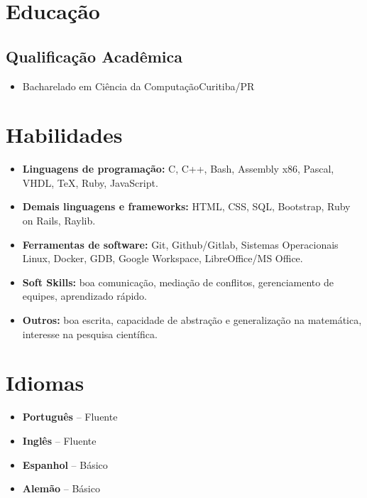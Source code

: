 \documentclass[a4paper, 12pt]{moderncv}
\begin{document}
\section{Educação}
\vspace{1pt}
\subsection{\small{Qualificação Acadêmica}}
\vspace{2pt}
\begin{itemize}
    \item{
        {Bacharelado em Ciência da Computação}{Curitiba/PR}{}{}}
\end{itemize}
\vspace{4pt}

\section{Habilidades}
\vspace{4pt}
\begin{itemize}
    \item{\textbf{Linguagens de programação:} C, C++, Bash, Assembly x86,
        Pascal, VHDL, \TeX, Ruby, JavaScript.}
    \vspace{4pt}
    \item{\textbf{Demais linguagens e frameworks:} HTML, CSS, SQL, Bootstrap, Ruby on Rails, Raylib.}
    \vspace{4pt}
    \item{\textbf{Ferramentas de software:} Git, Github/Gitlab, Sistemas
        Operacionais Linux, Docker, GDB, Google Workspace, LibreOffice/MS
        Office.}
    \vspace{4pt}
    \item{\textbf{Soft Skills:} boa comunicação, mediação de conflitos, gerenciamento
        de equipes, aprendizado rápido.}
    \vspace{4pt}
    \item{\textbf{Outros:} boa escrita, capacidade de abstração e generalização na
        matemática, interesse na pesquisa científica.}
\end{itemize}
\vspace{4pt}

\section{Idiomas}
\vspace{4pt}
\begin{itemize}
    \item{\textbf{Português} -- Fluente}
    \item{\textbf{Inglês} -- Fluente}
    \item{\textbf{Espanhol} -- Básico}
    \item{\textbf{Alemão} -- Básico}
\end{itemize}
\vspace{4pt}
\end{document}
